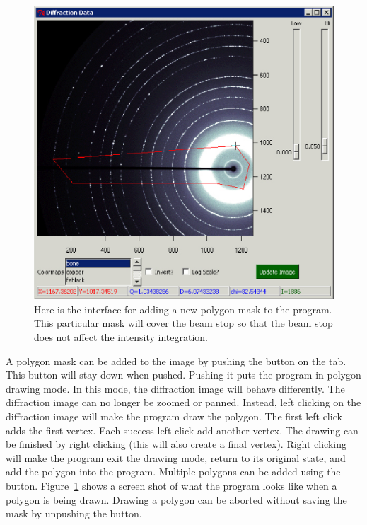 \begin{figure}
    \centering
    \includegraphics[scale=.75]{figures/Adding_Polygon.eps}
    \caption{Here is the interface for adding a new polygon 
    mask to the program. This particular mask will cover 
    the beam stop so that the beam stop does not affect
    the intensity integration.}
    \label{Adding_Polygon}
\end{figure}

A polygon mask can be added to the image by pushing
the  button on the  tab. 
This button will stay down when pushed.  Pushing it puts 
the program in polygon drawing mode.  In this mode, the 
diffraction image will behave differently. The diffraction
image can no longer be zoomed or panned.
Instead, left clicking on the diffraction image will make
the program draw the polygon.  The first left click adds the
first vertex. Each success left click add another vertex. 
The drawing can be finished by right clicking (this will
also create a final vertex). Right clicking will make
the program exit the drawing mode, return to its
original state, and add the polygon into the program. 
Multiple polygons can be added using the 
button. Figure~\ref{Adding_Polygon} shows a screen shot
of what the program looks like when a polygon is
being drawn. Drawing a polygon can be aborted without
saving the mask by unpushing the  button.

